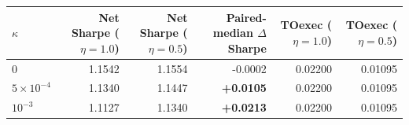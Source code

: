 \begin{tabular}{lrrrrr}
\hline
$\kappa$ & Net Sharpe ($\eta=1.0$) & Net Sharpe ($\eta=0.5$) & Paired-median $\Delta$ Sharpe & TOexec ($\eta=1.0$) & TOexec ($\eta=0.5$) \\
\hline
$0$ & 1.1542 & 1.1554 & -0.0002 & 0.02200 & 0.01095 \\
$5\times10^{-4}$ & 1.1340 & 1.1447 & \textbf{+0.0105} & 0.02200 & 0.01095 \\
$10^{-3}$ & 1.1127 & 1.1340 & \textbf{+0.0213} & 0.02200 & 0.01095 \\
\hline
\end{tabular}
